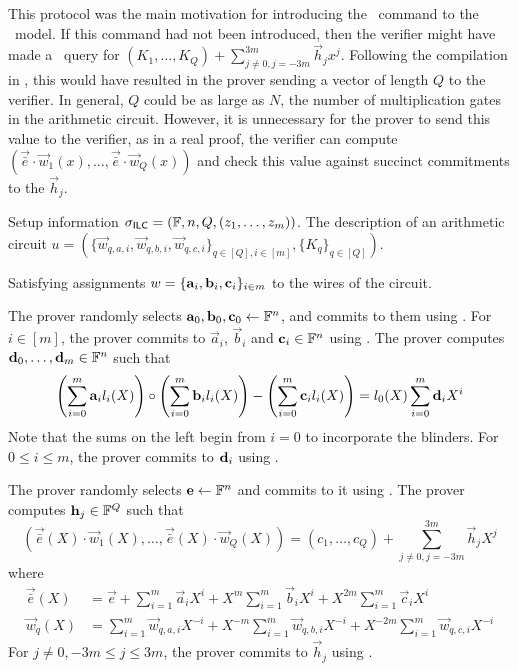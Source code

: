 This protocol was the main motivation for introducing the \ILCcheck\ command to the \ILC\ model. If this command had not been introduced, then the verifier might have made a \ILCopen\ query for $(K_1,\ldots,K_Q) + \sum_{j\neq 0, j=-3m}^{3m} \vec{h}_j {x^j}$. Following the compilation in \cite{BootleCGGHJ17}, this would have resulted in the prover sending a vector of length $Q$ to the verifier. In general, $Q$ could be as large as $N$, the number of multiplication gates in the arithmetic circuit. However, it is unnecessary for the prover to send this value to the verifier, as in a real proof, the verifier can compute $( \vec{\bar{e}}\cdot \vec{w}_1(x),\ldots, \vec{\bar{e}}\cdot \vec{w}_Q(x) )$ and check this value against succinct commitments to the $\vec{h}_j$.

\begin{description}\label{prot:3ac}
\item[Common input:] Setup information $\mathsf{\sigma}_{\mathsf{ILC}} = (\mathbb{F},n,Q,(z_1,\ldots,z_m))$. The description of an arithmetic circuit $u = \left( \{\vec{w}_{q,{a,i}},\vec{w}_{q,{b,i}},\vec{w}_{q,{c,i}}\}_{q \in [Q], i \in [m]}, \{K_{q}\}_{q \in [Q]}\right)$.
\item[Prover's witness:] Satisfying assignments $w = \{\mathbf{a}_i,\mathbf{b}_i,\mathbf{c}_i\}_{i \in m}$ to the wires of the circuit.
\item[Protocol:]
\item[\ P:]

The prover randomly selects $\mathbf{a}_{0},\mathbf{b}_{0},\mathbf{c}_{0}\gets \mathbb{F}^n$, and commits to them using \ILCcommit. For $i \in [m]$, the prover commits to $\vec{a}_{i}$, $\vec{b}_{i}$ and $\mathbf{c}_{i} \in \mathbb{F}^n$ using \ILCcommit. The prover computes $\mathbf{d}_0,\ldots,\mathbf{d}_m \in \mathbb{F}^n$ such that
\[
\left( \sum_{i=0}^m \mathbf{a}_{i} l_i(X) \right) \circ \left( \sum_{i=0}^m \mathbf{b}_{i} l_i(X) \right) - \left( \sum_{i=0}^m \mathbf{c}_{i} l_i(X) \right) = l_0(X) \sum_{i=0}^m \mathbf{d}_i X^i
\]
Note that the sums on the left begin from $i=0$ to incorporate the blinders. For $0 \leq i \leq m$, the prover commits to $\mathbf{d}_i$ using \ILCcommit.

The prover randomly selects $\mathbf{e} \gets \mathbb{F}^n$ and commits to it using \ILCcommit. The prover computes $\mathbf{h}_j \in \mathbb{F}^Q$ such that
\[
(\vec{\bar{e}}(X)\cdot \vec{w}_1(X),\ldots,\vec{\bar{e}}(X)\cdot \vec{w}_Q(X)) = (c_1,\ldots,c_Q) + \sum_{j\neq 0,j=-3m}^{3m} \vec{h}_{j} X^j
\]
where
\begin{align*}
\vec{\bar{e}}(X) &= \vec{e} + \sum_{i=1}^m \vec{a}_{i} X^i + X^m \sum_{i=1}^m \vec{b}_{i} X^i + X^{2m} \sum_{i=1}^m \vec{c}_{i} X^i \\
\vec{w}_q(X) &= \sum_{i=1}^m \vec{w}_{q,a,i} X^{-i} + X^{-m} \sum_{i=1}^m \vec{w}_{q,b,i} X^{-i} + X^{-2m} \sum_{i=1}^m \vec{w}_{q,c,i} X^{-i}
\end{align*}
For $j\neq 0,-3m \leq j \leq 3m$, the prover commits to $\vec{h}_j$ using \ILCcommit.


\end{description}
